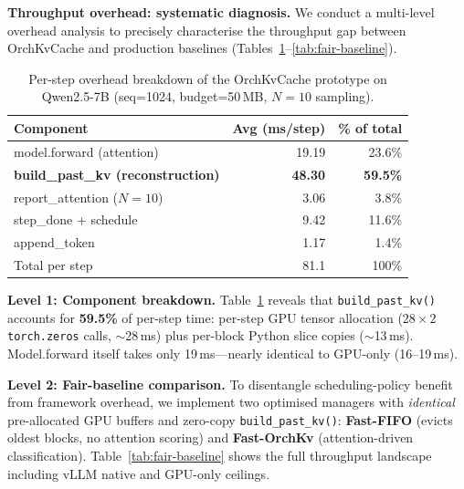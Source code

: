 \documentclass[conference]{IEEEtran}
\begin{document}
\textbf{Throughput overhead: systematic diagnosis.}
We conduct a multi-level overhead analysis to precisely characterise the throughput gap between OrchKvCache and production baselines (Tables~\ref{tab:overhead-breakdown}--\ref{tab:fair-baseline}).

\begin{table}[t]
\centering
\caption{Per-step overhead breakdown of the OrchKvCache prototype on Qwen2.5-7B (seq=1024, budget=50\,MB, $N{=}10$ sampling).}
\label{tab:overhead-breakdown}
\small
\setlength{\tabcolsep}{9pt}
\begin{tabular}{@{}lrr@{}}
\toprule
Component & Avg (ms/step) & \% of total \\
\midrule
model.forward (attention) & 19.19 & 23.6\% \\
\textbf{build\_past\_kv (reconstruction)} & \textbf{48.30} & \textbf{59.5\%} \\
report\_attention ($N{=}10$) & 3.06 & 3.8\% \\
step\_done + schedule & 9.42 & 11.6\% \\
append\_token & 1.17 & 1.4\% \\
\midrule
Total per step & 81.1 & 100\% \\
\bottomrule
\end{tabular}
\end{table}

\textbf{Level 1: Component breakdown.} Table~\ref{tab:overhead-breakdown} reveals that \texttt{build\_past\_kv()} accounts for \textbf{59.5\%} of per-step time: per-step GPU tensor allocation ($28{\times}2$ \texttt{torch.zeros} calls, ${\sim}$28\,ms) plus per-block Python slice copies (${\sim}$13\,ms). Model.forward itself takes only 19\,ms---nearly identical to GPU-only (16--19\,ms).

\textbf{Level 2: Fair-baseline comparison.} To disentangle scheduling-policy benefit from framework overhead, we implement two optimised managers with \emph{identical} pre-allocated GPU buffers and zero-copy \texttt{build\_past\_kv()}: \textbf{Fast-FIFO} (evicts oldest blocks, no attention scoring) and \textbf{Fast-OrchKv} (attention-driven classification). Table~\ref{tab:fair-baseline} shows the full throughput landscape including vLLM native and GPU-only ceilings.
\end{document}
